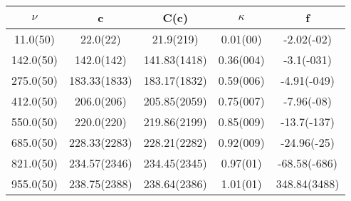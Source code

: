 \begin{table}[H]
	\centering
	\begin{tabular}{ccccc}
		$\nu$ & c & C(c) & $\kappa$ & f\\
		\hline
		11.0(50) & 22.0(22) & 21.9(219) & 0.01(00) & -2.02(-02)	\\
		142.0(50) & 142.0(142) & 141.83(1418) & 0.36(004) & -3.1(-031)	\\
		275.0(50) & 183.33(1833) & 183.17(1832) & 0.59(006) & -4.91(-049)	\\
		412.0(50) & 206.0(206) & 205.85(2059) & 0.75(007) & -7.96(-08)	\\
		550.0(50) & 220.0(220) & 219.86(2199) & 0.85(009) & -13.7(-137)	\\
		685.0(50) & 228.33(2283) & 228.21(2282) & 0.92(009) & -24.96(-25)	\\
		821.0(50) & 234.57(2346) & 234.45(2345) & 0.97(01) & -68.58(-686)	\\
		955.0(50) & 238.75(2388) & 238.64(2386) & 1.01(01) & 348.84(3488)	\\
	\end{tabular}
\end{table}